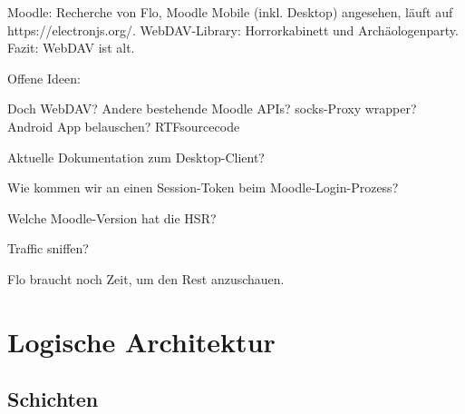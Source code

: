 \documentclass[a4paper]{article}
\let\oldsection\section
\renewcommand\section{\clearpage\oldsection}
\begin{document}
Moodle: Recherche von Flo, Moodle Mobile (inkl. Desktop) angesehen, läuft auf https://electronjs.org/. WebDAV-Library: Horrorkabinett und Archäologenparty. Fazit: WebDAV ist alt.

Offene Ideen:

Doch WebDAV?
Andere bestehende Moodle APIs?
socks-Proxy wrapper?
Android App belauschen?
RTFsourcecode

Aktuelle Dokumentation zum Desktop-Client?

Wie kommen wir an einen Session-Token beim Moodle-Login-Prozess?

Welche Moodle-Version hat die HSR?

Traffic sniffen?

Flo braucht noch Zeit, um den Rest anzuschauen.

\section{Logische Architektur}



\subsection{Schichten}
\end{document}

